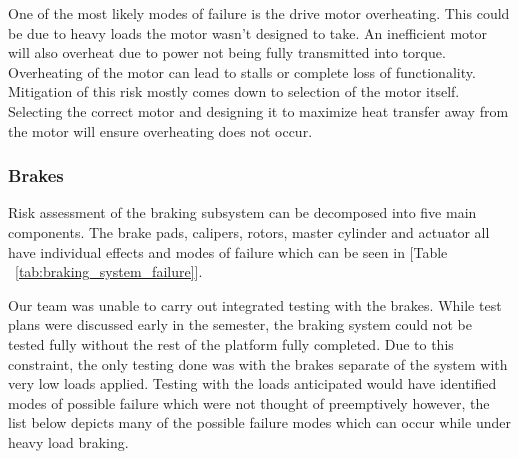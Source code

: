 One of the most likely modes of failure is the drive motor overheating. This could be due to heavy loads the motor wasn’t designed to take. An inefficient motor will also overheat due to power not being fully transmitted into torque. Overheating of the motor can lead to stalls or complete loss of functionality. Mitigation of this risk mostly comes down to selection of the motor itself. Selecting the correct motor and designing it to maximize heat transfer away from the motor will ensure overheating does not occur. 


\subsubsection{Brakes}


\indent\indent Risk assessment of the braking subsystem can be decomposed into five main components.  The brake pads, calipers, rotors, master cylinder and actuator all have individual effects and modes of failure which can be seen in [Table ~\ref{tab:braking_system_failure}].

Our team was unable to carry out integrated testing with the brakes. While test plans were discussed early in the semester, the braking system could not be tested fully without the rest of the platform fully completed. Due to this constraint, the only testing done was with the brakes separate of the system with very low loads applied. Testing with the loads anticipated would have identified modes of possible failure which were not thought of preemptively however, the list below depicts many of the possible failure modes which can occur while under heavy load braking. 

